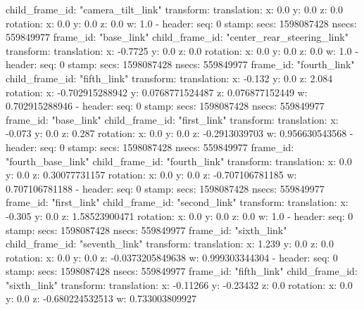     child_frame_id: "camera_tilt_link"
    transform: 
      translation: 
        x: 0.0
        y: 0.0
        z: 0.0
      rotation: 
        x: 0.0
        y: 0.0
        z: 0.0
        w: 1.0
  - 
    header: 
      seq: 0
      stamp: 
        secs: 1598087428
        nsecs: 559849977
      frame_id: "base_link"
    child_frame_id: "center_rear_steering_link"
    transform: 
      translation: 
        x: -0.7725
        y: 0.0
        z: 0.0
      rotation: 
        x: 0.0
        y: 0.0
        z: 0.0
        w: 1.0
  - 
    header: 
      seq: 0
      stamp: 
        secs: 1598087428
        nsecs: 559849977
      frame_id: "fourth_link"
    child_frame_id: "fifth_link"
    transform: 
      translation: 
        x: -0.132
        y: 0.0
        z: 2.084
      rotation: 
        x: -0.702915288942
        y: 0.0768771524487
        z: 0.076877152449
        w: 0.702915288946
  - 
    header: 
      seq: 0
      stamp: 
        secs: 1598087428
        nsecs: 559849977
      frame_id: "base_link"
    child_frame_id: "first_link"
    transform: 
      translation: 
        x: -0.073
        y: 0.0
        z: 0.287
      rotation: 
        x: 0.0
        y: 0.0
        z: -0.2913039703
        w: 0.956630543568
  - 
    header: 
      seq: 0
      stamp: 
        secs: 1598087428
        nsecs: 559849977
      frame_id: "fourth_base_link"
    child_frame_id: "fourth_link"
    transform: 
      translation: 
        x: 0.0
        y: 0.0
        z: 0.30077731157
      rotation: 
        x: 0.0
        y: 0.0
        z: -0.707106781185
        w: 0.707106781188
  - 
    header: 
      seq: 0
      stamp: 
        secs: 1598087428
        nsecs: 559849977
      frame_id: "first_link"
    child_frame_id: "second_link"
    transform: 
      translation: 
        x: -0.305
        y: 0.0
        z: 1.58523900471
      rotation: 
        x: 0.0
        y: 0.0
        z: 0.0
        w: 1.0
  - 
    header: 
      seq: 0
      stamp: 
        secs: 1598087428
        nsecs: 559849977
      frame_id: "sixth_link"
    child_frame_id: "seventh_link"
    transform: 
      translation: 
        x: 1.239
        y: 0.0
        z: 0.0
      rotation: 
        x: 0.0
        y: 0.0
        z: -0.0373205849638
        w: 0.999303344304
  - 
    header: 
      seq: 0
      stamp: 
        secs: 1598087428
        nsecs: 559849977
      frame_id: "fifth_link"
    child_frame_id: "sixth_link"
    transform: 
      translation: 
        x: -0.11266
        y: -0.23432
        z: 0.0
      rotation: 
        x: 0.0
        y: 0.0
        z: -0.680224532513
        w: 0.733003809927
